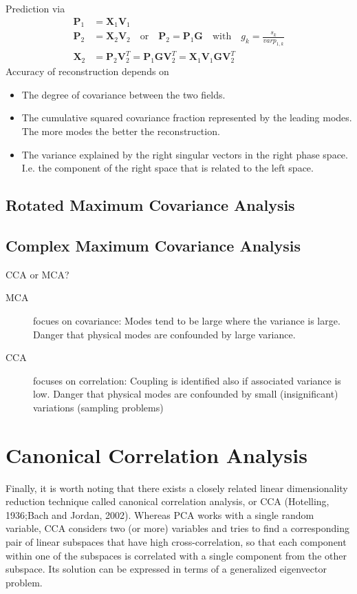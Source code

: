 Prediction via
\begin{align}
    \bm{P}_1 &= \bm{X}_1 \bm{V}_1 \\
    \bm{P}_2 &= \bm{X}_2 \bm{V}_2 \quad \text{or} \quad \bm{P}_2 = \bm{P}_1 \bm{G} \quad \text{with} \quad g_k = \frac{s_k}{var{p_{1,k}}} \\
    \bm{X}_2 &= \bm{P}_2 \bm{V}_2^T = \bm{P}_1 \bm{G} \bm{V}_2^T = \bm{X}_1 \bm{V}_1 \bm{G} \bm{V}_2^T
\end{align}
Accuracy of reconstruction depends on
\begin{itemize}
    \item The degree of covariance between the two fields.
    \item The cumulative squared covariance fraction represented by the leading modes. The more modes the better the reconstruction.
    \item The variance explained by the right singular vectors in the right phase space. I.e. the component of the right space that is related to the left space.
\end{itemize}

\subsection{Rotated Maximum Covariance Analysis}

\subsection{Complex Maximum Covariance Analysis}

CCA or MCA?
\begin{description}
    \item[MCA] focues on covariance: Modes tend to be large where the variance is large. Danger that physical modes are confounded by large variance.
    \item[CCA] focuses on correlation: Coupling is identified also if associated variance is low. Danger that physical modes are confounded by small (insignificant) variations (sampling problems)
\end{description}


\section{Canonical Correlation Analysis}
Finally, it is worth noting that there exists a closely related linear dimensionality reduction technique called canonical correlation analysis, or CCA (Hotelling, 1936;Bach and Jordan, 2002). Whereas PCA works with a single random variable, CCA considers two (or more) variables and tries to find a corresponding pair of linear subspaces that have high cross-correlation, so that each component within one of the subspaces is correlated with a single component from the other subspace. Its solution can be expressed in terms of a generalized eigenvector problem.




